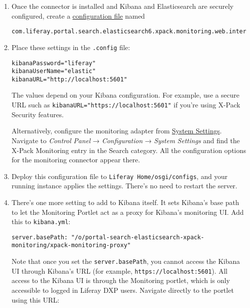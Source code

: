 \begin{enumerate}
\def\labelenumi{\arabic{enumi}.}
\item
  Once the connector is installed and Kibana and Elasticsearch are
  securely configured, create a
  \href{/docs/7-1/user/-/knowledge_base/u/understanding-system-configuration-files}{configuration
  file} named

\begin{verbatim}
com.liferay.portal.search.elasticsearch6.xpack.monitoring.web.internal.configuration.XPackMonitoringConfiguration.config
\end{verbatim}
\item
  Place these settings in the \texttt{.config} file:

\begin{verbatim}
kibanaPassword="liferay"
kibanaUserName="elastic"
kibanaURL="http://localhost:5601"
\end{verbatim}

  The values depend on your Kibana configuration. For example, use a
  secure URL such as \texttt{kibanaURL="https://localhost:5601"} if
  you're using X-Pack Security features.

  Alternatively, configure the monitoring adapter from
  \href{/docs/7-1/user/-/knowledge_base/u/system-settings}{System
  Settings}. Navigate to \emph{Control Panel} → \emph{Configuration} →
  \emph{System Settings} and find the X-Pack Monitoring entry in the
  Search category. All the configuration options for the monitoring
  connector appear there.
\item
  Deploy this configuration file to \texttt{Liferay\ Home/osgi/configs},
  and your running instance applies the settings. There's no need to
  restart the server.
\item
  There's one more setting to add to Kibana itself. It sets Kibana's
  base path to let the Monitoring Portlet act as a proxy for Kibana's
  monitoring UI. Add this to \texttt{kibana.yml}:

\begin{verbatim}
server.basePath: "/o/portal-search-elasticsearch-xpack-monitoring/xpack-monitoring-proxy"
\end{verbatim}

  Note that once you set the \texttt{server.basePath}, you cannot access
  the Kibana UI through Kibana's URL (for example,
  \texttt{https://localhost:5601}). All access to the Kibana UI is
  through the Monitoring portlet, which is only accessible to logged in
  Liferay DXP users. Navigate directly to the portlet using this URL:


\end{enumerate}

